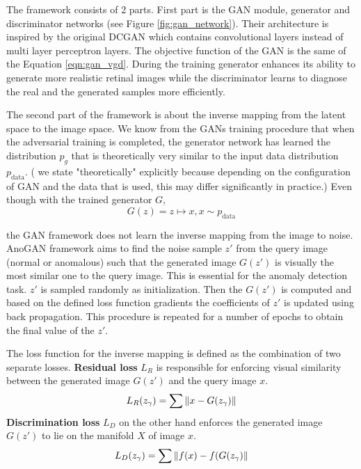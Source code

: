 The framework consists of 2 parts. First part is the GAN module, generator and discriminator
networks (see Figure \ref{fig:gan_network}). Their architecture is inspired by the original DCGAN
\cite{Radford2016UnsupervisedRL} which contains convolutional layers instead of multi layer perceptron 
layers. The objective function of the GAN is the same of the Equation \ref{eqn:gan_vgd}. 
During the training generator enhances its ability to generate more realistic
retinal images while the discriminator learns to diagnose the real and the generated samples more
efficiently. 

The second part of the framework is about the inverse mapping from the latent space to the image space. 
We know from the GANs training procedure that when the adversarial training is completed, the generator
network has learned the distribution $p_g$ that is theoretically very similar to the input data
distribution $p_{\text{data}}$. ( we state "theoretically" explicitly because depending on the
configuration of GAN and the data that is used, this may differ significantly in practice.) 
Even though with the trained generator $G$, 
$$
G(z) = z \mapsto x,x \sim p_{\text{data}}
$$

the GAN framework does not learn the inverse mapping from the image to noise. AnoGAN framework
aims to find the noise sample $z\prime$ from the query image (normal or anomalous) such that the
generated image $G(z\prime)$ is visually the most similar one to the query image. This is essential
for the anomaly detection task. $z\prime$ is sampled randomly as initialization. Then the
$G(z\prime)$ is computed and based on the defined loss function gradients the coefficients of
$z\prime$ is updated using back propagation. This procedure is repeated for a number of epochs to
obtain the final value of the $z\prime$. 

The loss function for the inverse mapping is defined as the combination of two separate losses.
\textbf{Residual loss} $L_R$ is responsible for enforcing visual similarity between the generated image
$G(z\prime)$ and the query image $x$.
\begin{equation}
    \label{eqn:anogan_rl}
    L_R (z_{\gamma}) = \sum \left\lVert x - G(z_{\gamma})\right\rVert
\end{equation} 
\textbf{Discrimination loss} $L_D$ on the other hand enforces the
generated image $G(z\prime)$ to lie on the manifold $X$ of image $x$.
\begin{equation}
    \label{eqn:anogan_dl}
    L_D (z_{\gamma}) = \sum  \left\lVert f(x) - f(G(z_{\gamma})\right\rVert
\end{equation}

